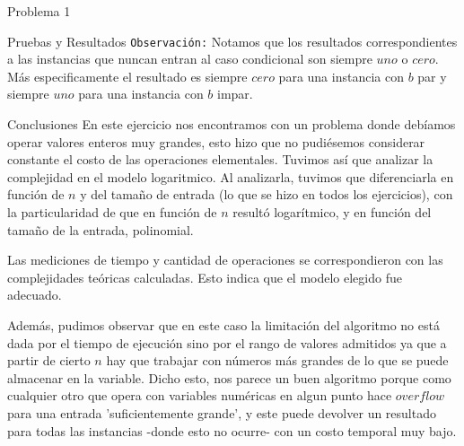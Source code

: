 \begin{section}{Problema 1}
\begin{subsection}{Pruebas y Resultados}
\texttt{Observación:}
Notamos que los resultados correspondientes a las instancias que nuncan entran al caso condicional son siempre $uno$ o $cero$. Más especificamente el resultado es siempre $cero$ para una instancia con $b$ par y siempre $uno$ para una instancia con $b$ impar.\VSP
	\end{subsection}

	\begin{subsection}{Conclusiones}
		En este ejercicio nos encontramos con un problema donde debíamos\\ operar valores enteros muy grandes, esto hizo que no pudiésemos considerar constante el costo de las operaciones elementales. Tuvimos así que analizar la complejidad en el modelo logaritmico. Al analizarla, tuvimos que diferenciarla en función de $n$ y del tamaño de entrada (lo que se hizo en todos los ejercicios), con la particularidad de que en función de $n$ resultó logarítmico, y en función del tamaño de la entrada, polinomial.

		Las mediciones de tiempo y cantidad de operaciones se correspondieron con las complejidades teóricas calculadas. Esto indica que el modelo elegido fue adecuado.

		Además, pudimos observar que en este caso la limitación del algoritmo no está dada por el tiempo de ejecución sino por el rango de valores admitidos ya que a partir de cierto $n$ hay que trabajar con números más grandes de lo que se puede almacenar en la variable. Dicho esto, nos parece un buen algoritmo porque como cualquier otro que opera con variables numéricas en algun punto hace $overflow$ para una entrada 'suficientemente grande', y este puede devolver un resultado para todas las instancias -donde esto no ocurre- con un costo temporal muy bajo.
	\end{subsection}
\end{section}

